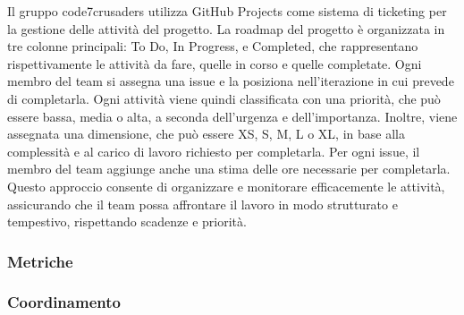 Il gruppo code7crusaders utilizza GitHub Projects come sistema di ticketing per la gestione delle attività del progetto. La roadmap del progetto è organizzata in tre colonne principali: To Do, In Progress, e Completed, che rappresentano rispettivamente le attività da fare, quelle in corso e quelle completate. Ogni membro del team si assegna una issue e la posiziona nell'iterazione in cui prevede di completarla. Ogni attività viene quindi classificata con una priorità, che può essere bassa, media o alta, a seconda dell'urgenza e dell'importanza. Inoltre, viene assegnata una dimensione, che può essere XS, S, M, L o XL, in base alla complessità e al carico di lavoro richiesto per completarla. Per ogni issue, il membro del team aggiunge anche una stima delle ore necessarie per completarla. Questo approccio consente di organizzare e monitorare efficacemente le attività, assicurando che il team possa affrontare il lavoro in modo strutturato e tempestivo, rispettando scadenze e priorità.


\subsubsection{Metriche}
\subsubsection{Coordinamento}
